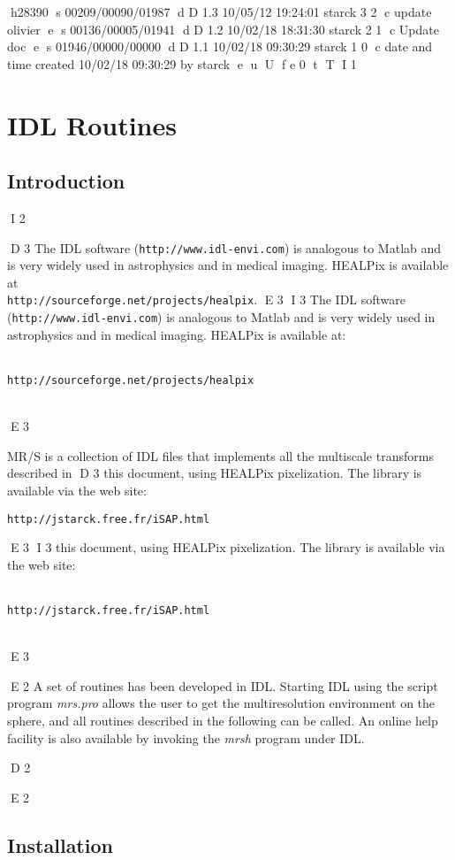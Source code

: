 h28390
s 00209/00090/01987
d D 1.3 10/05/12 19:24:01 starck 3 2
c update olivier
e
s 00136/00005/01941
d D 1.2 10/02/18 18:31:30 starck 2 1
c Update doc
e
s 01946/00000/00000
d D 1.1 10/02/18 09:30:29 starck 1 0
c date and time created 10/02/18 09:30:29 by starck
e
u
U
f e 0
t
T
I 1

\chapter{IDL Routines}
\label{ch_mrs_idl}


\section{Introduction}
I 2
 
D 3
The IDL software  (\texttt{http://www.idl-envi.com}) is analogous to Matlab and is very widely used in astrophysics and in medical imaging.  
HEALPix is available at \\
\texttt{http://sourceforge.net/projects/healpix}.
E 3
I 3
The IDL software (\texttt{http://www.idl-envi.com}) is analogous to Matlab and is very widely used in astrophysics and in medical imaging.  
HEALPix is available at:\\ \\
{\centerline{\texttt{http://sourceforge.net/projects/healpix}}}\\
E 3

MR/S is a collection of IDL files that implements all the multiscale transforms described in 
D 3
this document, using HEALPix pixelization. The library is available via the web site: \\
{\centerline{\texttt{http://jstarck.free.fr/iSAP.html}}}
E 3
I 3
this document, using HEALPix pixelization. The library is available via the web site:\\ \\
{\centerline{\texttt{http://jstarck.free.fr/iSAP.html}}}\\
E 3

E 2
A set of routines has been developed in IDL. Starting IDL using the script program {\em mrs.pro} allows the user 
to get the multiresolution environment on the sphere, and all routines described in the following can be called. 
An online help facility is also available by invoking the {\em mrsh} program under IDL.

D 2

E 2
\section{Installation}

